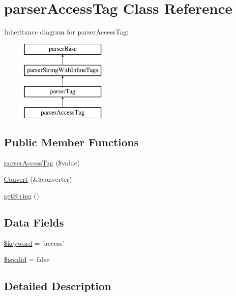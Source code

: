 \hypertarget{classparser_access_tag}{\section{parser\-Access\-Tag \-Class \-Reference}
\label{classparser_access_tag}
}
\-Inheritance diagram for parser\-Access\-Tag\-:\begin{figure}[H]
\begin{center}
\leavevmode
\includegraphics[height=4.000000cm]{classparser_access_tag}
\end{center}
\end{figure}
\subsection*{\-Public \-Member \-Functions}
\begin{DoxyCompactItemize}
\item 
\hyperlink{classparser_access_tag_ab1136a23fc4760b8779856dfb4777190}{parser\-Access\-Tag} (\$value)
\item 
\hyperlink{classparser_access_tag_a31e57fd66b58b300f8a489aa1b9431f6}{\-Convert} (\&\$converter)
\item 
\hyperlink{classparser_access_tag_afde980915cc78c408e6ac75b662e631c}{get\-String} ()
\end{DoxyCompactItemize}
\subsection*{\-Data \-Fields}
\begin{DoxyCompactItemize}
\item 
\hyperlink{classparser_access_tag_a4a925d6b38bcf3957c713a7d3dc7da1f}{\$keyword} = 'access'
\item 
\hyperlink{classparser_access_tag_a836830dd749f0dce60c36cd6bcf5a580}{\$isvalid} = false
\end{DoxyCompactItemize}


\subsection{\-Detailed \-Description}


